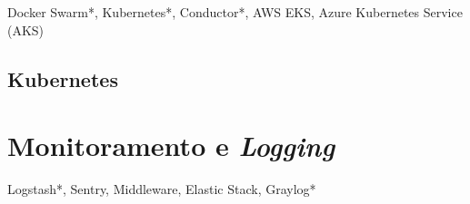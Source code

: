 Docker Swarm*, Kubernetes*, Conductor*, AWS EKS, Azure Kubernetes Service (AKS)

\subsection{Kubernetes}










\section{Monitoramento e \emph{Logging}}
Logstash*, Sentry, Middleware, Elastic Stack, Graylog*

